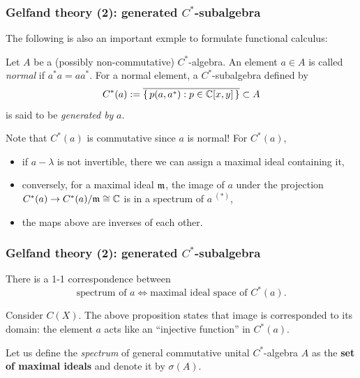 \documentclass[10pt,handout]{beamer}
\begin{document}
\begin{frame}
\frametitle{Gelfand theory (2): generated $C^*$-subalgebra}
  The following is also an important exmple to formulate functional calculus:
  \begin{defn}
    Let $A$ be a (possibly non-commutative) $C^*$-algebra.
    An element $a\in A$ is called \emph{normal} if $a^*a=aa^*$.
    For a normal element, a $C^*$-subalgebra defined by
    \[C^*(a):=\overline{\{\,p(a,a^*):p\in\mathbb{C}[x,y]\,\}}\subset A\]
    is said to be \emph{generated by} $a$.
  \end{defn}
  \pause Note that $C^*(a)$ is commutative since $a$ is normal! For $C^*(a)$,
  \pause
  \begin{itemize}[<+->]
    \item if $a-\lambda$ is not invertible, there we can assign a maximal ideal containing it,
    \item conversely, for a maximal ideal $\mathfrak{m}$, the image of $a$ under the projection $C^*(a)\to C^*(a)/\fm\cong\C$ is in a spectrum of $a\ ^{(*)}$,
    \item the maps above are inverses of each other.
  \end{itemize}
\end{frame}

\begin{frame}
\frametitle{Gelfand theory (2): generated $C^*$-subalgebra}
  \begin{prop}
    There is a 1-1 correspondence between
    \[\text{spectrum of $a$}\iff\text{maximal ideal space of $C^*(a)$}.\]
  \end{prop}
  \pause
  Consider $C(X)$.
  The above proposition states that image is corresponded to its domain: the element $a$ acts like an ``injective function'' in $C^*(a)$.
  \pause
  \begin{defn}
    Let us define the \emph{spectrum} of general commutative unital $C^*$-algebra $A$ as the \textbf{set of maximal ideals} and denote it by $\sigma(A)$.
  \end{defn}
\end{frame}
\end{document}
